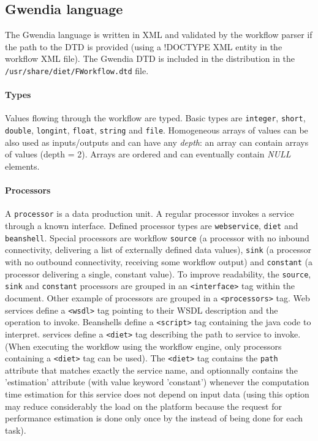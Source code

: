\subsection{Gwendia language}
\label{sec:wf_desc}
The Gwendia language is written in XML and validated by the workflow parser if
the path to the DTD is provided (using a !DOCTYPE XML entity in the workflow
XML file). The Gwendia DTD is included in the \diet distribution in the
\verb|/usr/share/diet/FWorkflow.dtd| file.

\paragraph{Types} Values flowing through the workflow are typed.
Basic types are \texttt{integer}, \texttt{short}, \texttt{double},
\texttt{longint}, \texttt{float}, \texttt{string} and
\texttt{file}. Homogeneous arrays of values can be also used as inputs/outputs
and can have any \textit{depth}: an array can contain arrays of values (depth =
2). Arrays are ordered and can eventually contain \textit{NULL} elements.

\paragraph{Processors} A \texttt{processor} is a data production unit. 
A regular processor invokes a service through a known interface. Defined
processor types are \texttt{webservice}, \texttt{diet} and
\texttt{beanshell}. Special processors are workflow \texttt{source} (a
processor with no inbound connectivity, delivering a list of externally defined
data values), \texttt{sink} (a processor with no outbound connectivity,
receiving some workflow output) and \texttt{constant} (a processor delivering a
single, constant value). To improve readability, the \texttt{source},
\texttt{sink} and \texttt{constant} processors are grouped in an
\texttt{<interface>} tag within the document. Other example of processors are
grouped in a \texttt{<processors>} tag. Web services define a \texttt{<wsdl>}
tag pointing to their WSDL description and the operation to invoke. Beanshells
define a \texttt{<script>} tag containing the java code to interpret. \diet
services define a \texttt{<diet>} tag describing the path to service to
invoke. (When executing the workflow using the \diet workflow engine, only
processors containing a \texttt{<diet>} tag can be used). The \texttt{<diet>}
tag contains the \texttt{path} attribute that matches exactly the \diet service
name, and optionnally contains the 'estimation' attribute (with value keyword
'constant') whenever the computation time estimation for this service does not
depend on input data (using this option may reduce considerably the load on the
\diet platform because the request for performance estimation is done only once
by the \madag instead of being done for each task).

